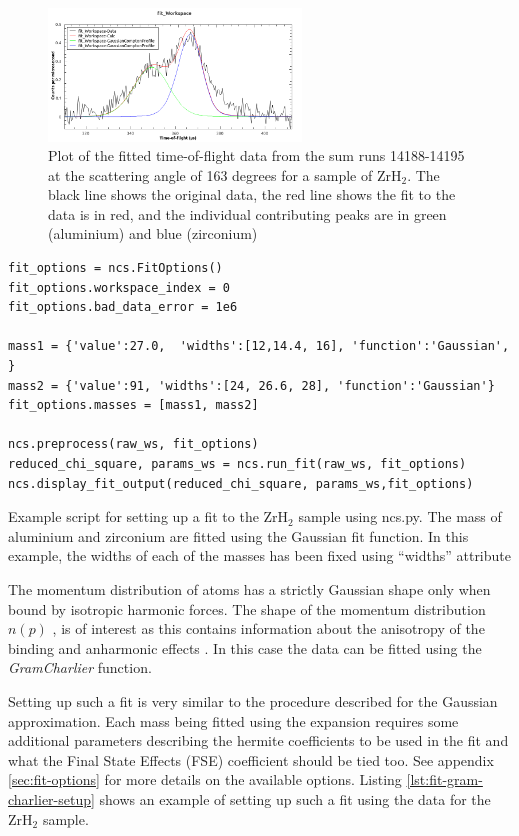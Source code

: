 \documentclass[paper=a4, fontsize=11pt]{scrartcl}	%
\numberwithin{equation}{section}															%
\numberwithin{figure}{section}																%
\numberwithin{table}{section}
\begin{document}
\begin{figure}[H]
\centering
\includegraphics[width=0.6\textwidth]{img/gaussian-fit-example.png}
\caption{Plot of the fitted time-of-flight data from the sum runs 14188-14195 at the scattering angle of 163 degrees for a sample of ZrH$_2$. The black line shows the original data, the red line shows the fit to the data is in red, and the individual contributing peaks are in green (aluminium) and blue (zirconium)}
\label{fig:gaussian-example-fit}
\end{figure}

\begin{listing}[H]
\begin{verbatim}
fit_options = ncs.FitOptions()
fit_options.workspace_index = 0
fit_options.bad_data_error = 1e6

mass1 = {'value':27.0,  'widths':[12,14.4, 16], 'function':'Gaussian', }
mass2 = {'value':91, 'widths':[24, 26.6, 28], 'function':'Gaussian'}
fit_options.masses = [mass1, mass2]

ncs.preprocess(raw_ws, fit_options)
reduced_chi_square, params_ws = ncs.run_fit(raw_ws, fit_options)
ncs.display_fit_output(reduced_chi_square, params_ws,fit_options)
\end{verbatim}
\caption{Example script for setting up a fit to the ZrH$_2$ sample using ncs.py. The mass of aluminium and zirconium are fitted using the Gaussian fit function. In this example, the widths of each of the masses has been fixed using ``widths'' attribute}
\label{lst:fit-setup}
\end{listing}

The momentum distribution of atoms has a strictly Gaussian shape only when bound by isotropic harmonic forces. The shape of the momentum distribution $n(p)$ \cite{mayers2004vesuvio}, is of interest as this contains information about the anisotropy of the binding and anharmonic effects \cite{andreani2005measurement}. In this case the data can be fitted using the \textit{GramCharlier} function. 

Setting up such a fit is very similar to the procedure described for the Gaussian approximation. Each mass being fitted using the expansion requires some additional parameters describing the hermite coefficients to be used in the fit and what the Final State Effects (FSE) coefficient should be tied too. See appendix \ref{sec:fit-options} for more details on the available options. Listing \ref{lst:fit-gram-charlier-setup} shows an example of setting up such a fit using the data for the ZrH$_2$ sample.
\end{document}
